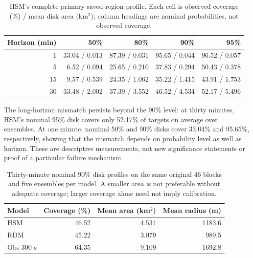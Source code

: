 \begin{table}[htbp]
\centering\small
\caption{HSM's complete primary saved-region profile. Each cell is
observed coverage (\%) / mean disk area (km\(^{2}\)); column headings
are nominal probabilities, not observed coverage.}
\label{tab:full-calibration-area}\hypertarget{tab:full-calibration-area}{}
\begin{tabular}{rrrrr}
\toprule
Horizon (min) & 50\% & 80\% & 90\% & 95\%\\
\midrule
1 & 33.04 / 0.013 & 87.39 / 0.031 & 95.65 / 0.044 & 96.52 / 0.057\\
5 & 6.52 / 0.094 & 25.65 / 0.210 & 37.83 / 0.294 & 50.43 / 0.378\\
15 & 9.57 / 0.539 & 24.35 / 1.062 & 35.22 / 1.415 & 43.91 / 1.753\\
30 & 33.48 / 2.002 & 37.39 / 3.552 & 46.52 / 4.534 & 52.17 / 5.496\\
\bottomrule
\end{tabular}
\end{table}

The long-horizon mismatch persists beyond the 90\% level: at thirty minutes,
HSM's nominal 95\% disk covers only 52.17\% of targets on average over
ensembles. At one minute, nominal 50\% and 90\% disks cover 33.04\% and
95.65\%, respectively, showing that the mismatch depends on probability
level as well as horizon. These are descriptive measurements, not new
significance statements or proof of a particular failure mechanism.

\begin{table}[htbp]
\centering\small
\caption{Thirty-minute nominal 90\% disk profiles on the same original
46 blocks and five ensembles per model. A smaller area is not preferable
without adequate coverage; larger coverage alone need not imply calibration.}
\label{tab:model-region-size}\hypertarget{tab:model-region-size}{}
\begin{tabular}{lrrr}
\toprule
Model & Coverage (\%) & Mean area (km\(^{2}\)) & Mean radius (m)\\
\midrule
HSM & 46.52 & 4.534 & 1183.6\\
RDM & 45.22 & 3.079 & 989.5\\
Obs 300 s & 64.35 & 9.109 & 1692.8\\
\bottomrule
\end{tabular}
\end{table}

